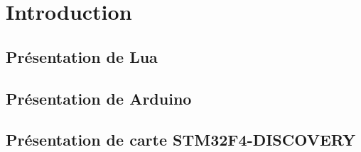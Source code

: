 \chapter*{Introduction} \label{chap:intro}

\section*{Présentation de Lua}

\section*{Présentation de Arduino}

\section*{Présentation de carte STM32F4-DISCOVERY}
